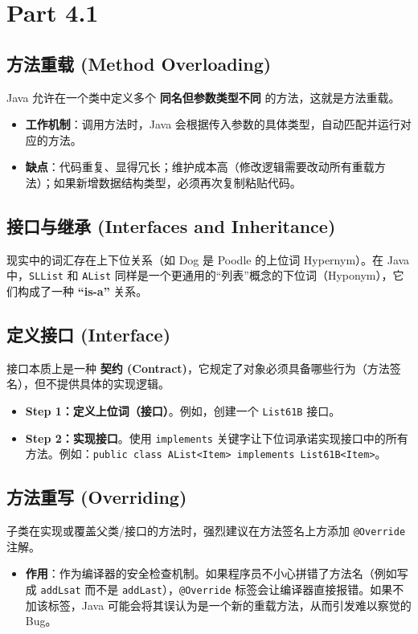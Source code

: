 \documentclass[12pt, a4paper, openany]{ctexbook} %
\begin{document}
\section{Part 4.1}

\subsection{方法重载 (Method Overloading)}
Java 允许在一个类中定义多个 \textbf{同名但参数类型不同} 的方法，这就是方法重载。
\begin{itemize}
    \item \textbf{工作机制}：调用方法时，Java 会根据传入参数的具体类型，自动匹配并运行对应的方法。
    \item \textbf{缺点}：代码重复、显得冗长；维护成本高（修改逻辑需要改动所有重载方法）；如果新增数据结构类型，必须再次复制粘贴代码。
\end{itemize}

\subsection{接口与继承 (Interfaces and Inheritance)}
现实中的词汇存在上下位关系（如 Dog 是 Poodle 的上位词 Hypernym）。在 Java 中，\texttt{SLList} 和 \texttt{AList} 同样是一个更通用的“列表”概念的下位词（Hyponym），它们构成了一种 \textbf{“is-a”} 关系。

\subsection{定义接口 (Interface)}
接口本质上是一种 \textbf{契约 (Contract)}，它规定了对象必须具备哪些行为（方法签名），但不提供具体的实现逻辑。
\begin{itemize}
    \item \textbf{Step 1：定义上位词（接口）}。例如，创建一个 \texttt{List61B} 接口。
    \item \textbf{Step 2：实现接口}。使用 \texttt{implements} 关键字让下位词承诺实现接口中的所有方法。例如：\texttt{public class AList<Item> implements List61B<Item>}。
\end{itemize}

\subsection{方法重写 (Overriding)}
子类在实现或覆盖父类/接口的方法时，强烈建议在方法签名上方添加 \texttt{@Override} 注解。
\begin{itemize}
    \item \textbf{作用}：作为编译器的安全检查机制。如果程序员不小心拼错了方法名（例如写成 \texttt{addLsat} 而不是 \texttt{addLast}），\texttt{@Override} 标签会让编译器直接报错。如果不加该标签，Java 可能会将其误认为是一个新的重载方法，从而引发难以察觉的 Bug。
\end{itemize}
\end{document}

